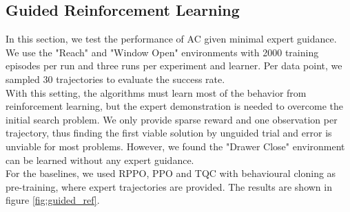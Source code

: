 \subsection{Guided Reinforcement Learning}
\label{sec:g_ref_ler}
In this section, we test the performance of AC given minimal expert guidance. We use the "Reach" and "Window Open" environments with 2000 training episodes per run and three runs per experiment and learner.
Per data point, we sampled 30 trajectories to evaluate the success rate.\\
With this setting, the algorithms must learn most of the behavior from reinforcement learning, but the expert
demonstration is needed to overcome the initial search problem. We only provide sparse reward and one observation per trajectory, thus finding the first viable solution by unguided
trial and error is unviable for most problems. However, we found the "Drawer Close" environment can be learned without any expert guidance.\\
For the baselines, we used RPPO, PPO and TQC with behavioural cloning as pre-training, where expert trajectories are provided. The results
are shown in figure \ref{fig:guided_ref}.

